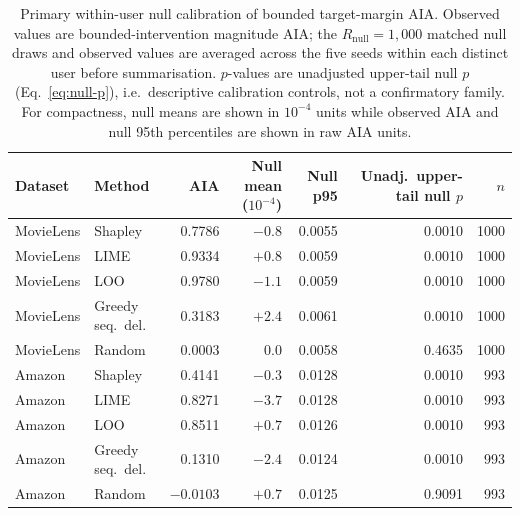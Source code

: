 \begin{table}[!htbp]\centering\scriptsize
\setlength{\tabcolsep}{2.5pt}
\caption{Primary within-user null calibration of bounded target-margin AIA. Observed values are bounded-intervention magnitude AIA; the $R_{\mathrm{null}}=1{,}000$ matched null draws and observed values are averaged across the five seeds within each distinct user before summarisation. $p$-values are unadjusted upper-tail null $p$ (Eq.~\ref{eq:null-p}), i.e.\ descriptive calibration controls, not a confirmatory family. For compactness, null means are shown in $10^{-4}$ units while observed AIA and null 95th percentiles are shown in raw AIA units.}
\label{tab:aia-null}
\begin{tabular}{@{}llrrrrr@{}}
\toprule
Dataset & Method & AIA & Null mean ($10^{-4}$) & Null p95 & Unadj.\ upper-tail null $p$ & $n$ \\
\midrule
MovieLens & Shapley & 0.7786 & $-0.8$ & 0.0055 & 0.0010 & 1000 \\
MovieLens & LIME & 0.9334 & $+0.8$ & 0.0059 & 0.0010 & 1000 \\
MovieLens & LOO & 0.9780 & $-1.1$ & 0.0059 & 0.0010 & 1000 \\
MovieLens & Greedy seq.\ del. & 0.3183 & $+2.4$ & 0.0061 & 0.0010 & 1000 \\
MovieLens & Random & 0.0003 & $0.0$ & 0.0058 & 0.4635 & 1000 \\
\midrule
Amazon & Shapley & 0.4141 & $-0.3$ & 0.0128 & 0.0010 & 993 \\
Amazon & LIME & 0.8271 & $-3.7$ & 0.0128 & 0.0010 & 993 \\
Amazon & LOO & 0.8511 & $+0.7$ & 0.0126 & 0.0010 & 993 \\
Amazon & Greedy seq.\ del. & 0.1310 & $-2.4$ & 0.0124 & 0.0010 & 993 \\
Amazon & Random & $-0.0103$ & $+0.7$ & 0.0125 & 0.9091 & 993 \\
\bottomrule
\end{tabular}
\end{table}